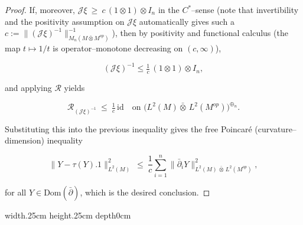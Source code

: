 \documentclass[10pt,a4paper,reqno]{amsart}
\def\qed{ \hfill \vrule width.25cm height.25cm depth0cm\smallskip}
\newcommand{\Dom}{\mathrm{Dom}}
\begin{document}
\begin{proof}
If, moreover, $\mathscr{J}\xi\ \ge\ c\,(1\otimes 1)\otimes I_n$ in the $C^\ast$–sense (note that invertibility and the positivity assumption on $\mathscr{J}\xi$ automatically gives such a $c:=\lVert (\mathscr{J}\xi)^{-1}\rVert_{M_n(M\bar\otimes M^{op})}^{-1}$),
then by positivity and functional calculus (the map $t\mapsto 1/t$ is
operator–monotone decreasing on $(c,\infty)$),


\[
(\mathscr{J}\xi)^{-1} \le \tfrac{1}{c}\,(1\otimes 1)\otimes I_n,
\]


and applying $\mathcal{R}$ yields


\[
\mathcal{R}_{(\mathscr{J}\xi)^{-1}}\ \le\ \tfrac{1}{c}\,\mathrm{id}
\quad\text{on }\big(L^2(M){\bar\otimes}\,L^2(M^{op})\big)^{\oplus_n}.
\]


Substituting this into the previous inequality gives the free Poincar\'e
(curvature–dimension) inequality


\[
\big\|Y-\tau(Y).1\big\|_{L^2(M)}^2
\ \le\
\frac{1}{c}\sum_{i=1}^n
\big\|\bar{\partial}_i Y\big\|^2_{L^2(M)\,\bar\otimes\, L^2(M^{op})},
\]


for all $Y\in \Dom(\bar\partial)$, which is the desired conclusion.
\end{proof}
\qed
\end{document}
